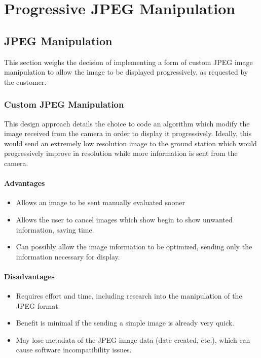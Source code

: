 \section{Progressive JPEG Manipulation}

\subsection{JPEG Manipulation}

This section weighs the decision of implementing a form of custom JPEG image manipulation to 
allow the image to be displayed progressively, as requested by the customer.

\subsubsection{Custom JPEG Manipulation}

This design approach details the choice to code an algorithm which 
modify the image received from the camera in order to display it progressively. 
Ideally, this would send an extremely low resolution image to the ground station which 
would progressively improve in resolution while more information is sent from the camera.

\paragraph*{Advantages}
\begin{itemize}
	\item Allows an image to be sent manually evaluated sooner
	\item Allows the user to cancel images which show begin to show unwanted information, saving time.
	\item Can possibly allow the image information to be optimized, sending only the information necessary for display.
\end{itemize}

\paragraph*{Disadvantages}
\begin{itemize}
	\item Requires effort and time, including research into the manipulation of the JPEG format.
	\item Benefit is minimal if the sending a simple image is already very quick.
	\item May lose metadata of the JPEG image data (date created, etc.), which can cause software incompatibility issues.
\end{itemize}

